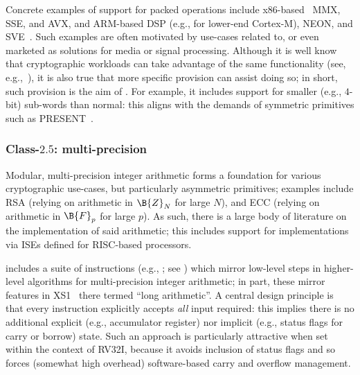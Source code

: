 Concrete examples of support for packed operations include
x86-based~\cite[Section 2.2.7]{SCARV:X86:2:18} MMX, SSE, and AVX,
and
ARM-based DSP (e.g., for lower-end Cortex-M), NEON, and SVE~\cite{SCARV:SBBEEGHMMPRRW:17}.
Such examples are often motivated by use-cases related to, or even marketed 
as solutions for media or signal processing.  Although it is well know that
cryptographic workloads can take advantage of the same functionality
(see, e.g.,~\cite{SCARV:Hamburg:09,SCARV:BerSch:12}),
it is also true that more specific provision can assist doing so; in short,
such provision is the aim of \XCID.  For example, it includes support for
smaller (e.g., $4$-bit) sub-words than normal: this aligns with the demands
of symmetric primitives such as PRESENT~\cite{SCARV:BKLPPRSV:07}.


\subsubsection{Class-$2.5$: multi-precision}
\label{sec:bg:feature:2:5}

Modular, multi-precision integer arithmetic forms a foundation for various
cryptographic use-cases, but particularly asymmetric primitives; examples 
include
RSA (relying on arithmetic in $\B{Z}_N$ for large $N$),
and
ECC (relying on arithmetic in $\B{F}_p$ for large $p$).
As such, there is a large body of literature on the implementation of said 
arithmetic; this includes support for implementations via ISEs defined for 
RISC-based processors.

\XCID includes a suite of instructions 
(e.g., ; see )
which mirror low-level steps in higher-level algorithms for multi-precision 
integer arithmetic; in part, these mirror features in 
XS1~\cite[Section 18]{SCARV:XS1:09} 
there termed ``long arithmetic''.  A central design principle is that every
instruction explicitly accepts {\em all} input required: this implies there
is no additional
explicit (e.g., accumulator register) 
nor 
implicit (e.g., status flags for carry or borrow)
state.
Such an approach is particularly attractive when set within the context of 
RV32I, because it avoids inclusion of status flags and so forces (somewhat 
high overhead) software-based carry and overflow management.


